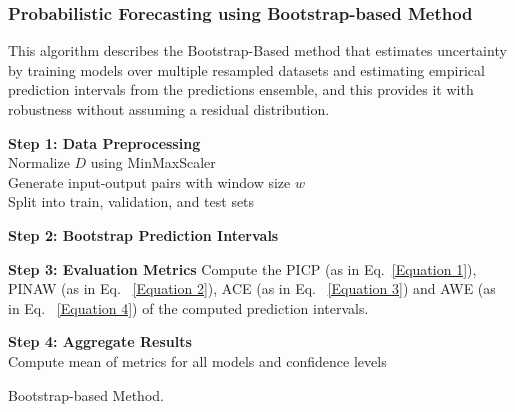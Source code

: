 \begin{itemize}
    \subsubsection{Probabilistic Forecasting using Bootstrap-based Method}
    This algorithm describes the Bootstrap-Based method that estimates uncertainty by training models over multiple resampled datasets and estimating empirical prediction intervals from the predictions ensemble, and this provides it with robustness without assuming a residual distribution.\\
        
        \begin{algorithm}[H]
        \footnotesize
        \SetAlgoCaptionSeparator{:}
    
    
        \textbf{Step 1: Data Preprocessing}\\
        Normalize $D$ using MinMaxScaler\\
        Generate input-output pairs with window size $w$\\
        Split into train, validation, and test sets
    
        \textbf{Step 2: Bootstrap Prediction Intervals}\\
    
        \textbf{Step 3: Evaluation Metrics} Compute the PICP (as in Eq.~\eqref{Equation 1}), PINAW (as in Eq. ~\eqref{Equation 2}), ACE (as in Eq. ~\eqref{Equation 3}) and AWE (as in Eq. ~\eqref{Equation 4}) of the computed prediction intervals.
    
        \textbf{Step 4: Aggregate Results}\\
        Compute mean of metrics for all models and confidence levels
    
        \caption{Bootstrap-based Method.}
        \end{algorithm}


\end{itemize}
